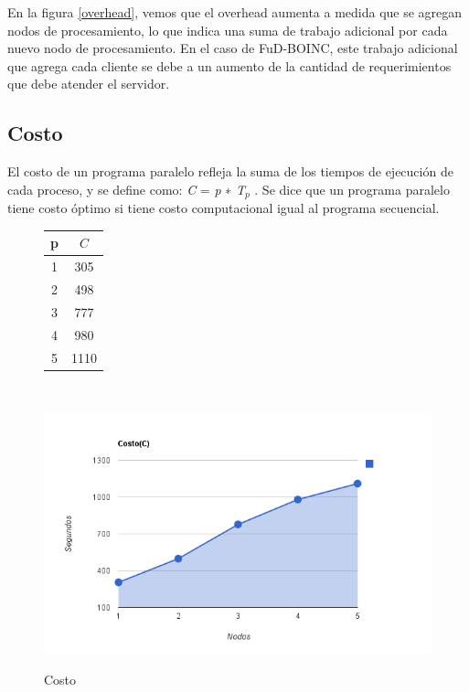 En la figura \ref{overhead}, vemos que el overhead aumenta a medida que se agregan nodos de procesamiento, lo que indica una suma de trabajo adicional por cada nuevo nodo de procesamiento. En el caso de FuD-BOINC, este trabajo adicional que agrega cada cliente se debe a un aumento de la cantidad de requerimientos que debe atender el servidor.

\subsection{Costo}

El costo de un programa paralelo refleja la suma de los tiempos de ejecución de cada proceso, y se define como:
 \textit{C} = \textit{p} ∗ \textit{T$_{p}$} . Se dice que un programa paralelo tiene costo óptimo si tiene costo computacional igual al programa secuencial.

\newpage
\begin{center}
\begin{figure}[!ht]
    \begin{minipage}{2,5cm}
    \begin{flushleft}
    \begin{tabular*}{2,0cm}{c@{\extracolsep{\fill}}c}
        \hline
        \textbf{p} & \textbf{$C$} \\ \hline 
        1  & 305 \\ \hline
        2  & 498 \\ \hline
        3  & 777 \\ \hline
        4  & 980 \\ \hline
        5  & 1110 \\ \hline
    \end{tabular*}
    \end{flushleft}
    \end{minipage}
    \    \ \hfill
    \begin{minipage}{12cm}
    \includegraphics[scale=0.6]{images/Grafico_Costo.png}\\
    \end{minipage}
    \caption{Costo}
    \label{cost}
\end{figure}
\end{center}


